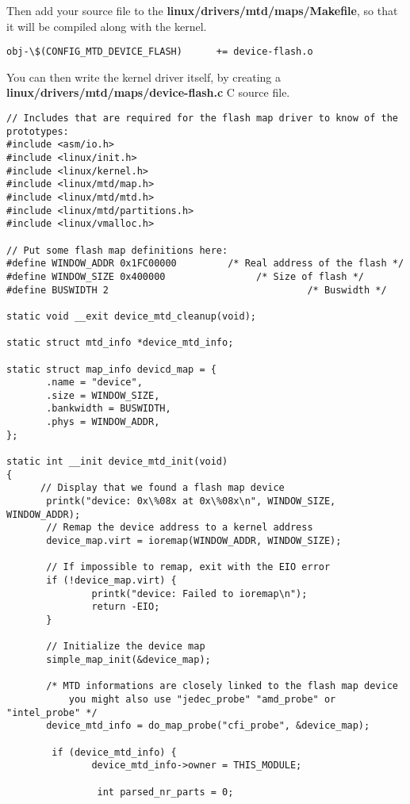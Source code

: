 Then add your source file to the \textbf{linux/drivers/mtd/maps/Makefile}, so 
that it will be compiled along with the kernel.

\begin{verbatim}
obj-\$(CONFIG_MTD_DEVICE_FLASH)      += device-flash.o
\end{verbatim}

You can then write the kernel driver itself, by creating a 
\textbf{linux/drivers/mtd/maps/device-flash.c} C source file.

\begin{verbatim}
// Includes that are required for the flash map driver to know of the prototypes:
#include <asm/io.h>
#include <linux/init.h>
#include <linux/kernel.h>
#include <linux/mtd/map.h>
#include <linux/mtd/mtd.h>
#include <linux/mtd/partitions.h>
#include <linux/vmalloc.h>

// Put some flash map definitions here:
#define WINDOW_ADDR 0x1FC00000         /* Real address of the flash */
#define WINDOW_SIZE 0x400000                /* Size of flash */
#define BUSWIDTH 2                                   /* Buswidth */

static void __exit device_mtd_cleanup(void);

static struct mtd_info *device_mtd_info;

static struct map_info devicd_map = {
       .name = "device",
       .size = WINDOW_SIZE,
       .bankwidth = BUSWIDTH,
       .phys = WINDOW_ADDR,
};

static int __init device_mtd_init(void)
{
	  // Display that we found a flash map device 
       printk("device: 0x\%08x at 0x\%08x\n", WINDOW_SIZE, WINDOW_ADDR);
	   // Remap the device address to a kernel address
       device_map.virt = ioremap(WINDOW_ADDR, WINDOW_SIZE);

       // If impossible to remap, exit with the EIO error
       if (!device_map.virt) {
               printk("device: Failed to ioremap\n");
               return -EIO;
       }

	   // Initialize the device map
       simple_map_init(&device_map);

	   /* MTD informations are closely linked to the flash map device
	       you might also use "jedec_probe" "amd_probe" or "intel_probe" */
       device_mtd_info = do_map_probe("cfi_probe", &device_map);

 		if (device_mtd_info) {
               device_mtd_info->owner = THIS_MODULE;

				int parsed_nr_parts = 0;


\end{verbatim}
